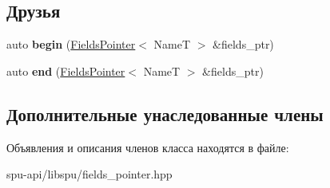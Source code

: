 \subsection*{Друзья}
\begin{DoxyCompactItemize}
\item 
\mbox{\label{class_s_p_u_1_1_fields_pointer_aa8066818cce7efa3faa8e0117075ea63}} 
auto {\bfseries begin} (\hyperlink{class_s_p_u_1_1_fields_pointer}{Fields\+Pointer}$<$ NameT $>$ \&fields\+\_\+ptr)
\item 
\mbox{\label{class_s_p_u_1_1_fields_pointer_aaa7f57577e0e7299836974c4f3c287ed}} 
auto {\bfseries end} (\hyperlink{class_s_p_u_1_1_fields_pointer}{Fields\+Pointer}$<$ NameT $>$ \&fields\+\_\+ptr)
\end{DoxyCompactItemize}
\subsection*{Дополнительные унаследованные члены}


Объявления и описания членов класса находятся в файле\+:\begin{DoxyCompactItemize}
\item 
spu-\/api/libspu/fields\+\_\+pointer.\+hpp\end{DoxyCompactItemize}
